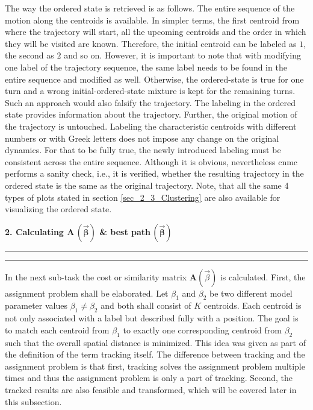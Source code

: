  The way the ordered state is retrieved is as follows. The entire sequence of the motion along the centroids is available. In simpler terms, the first centroid from where the trajectory will start, all the upcoming centroids and the order in which they will be visited are known. 
 Therefore, the initial centroid can be labeled as $1$, the second as $2$ and so on. 
 However, it is important to note that with modifying one label of the trajectory sequence, the same label needs to be found in the entire sequence and modified as well. 
 Otherwise, the ordered-state is true for one turn and a wrong initial-ordered-state mixture is kept for the remaining turns. 
 Such an approach would also falsify the trajectory.
 The labeling in the ordered state provides information about the trajectory. 
Further, the original motion of the trajectory is untouched. Labeling the characteristic centroids with different numbers or with Greek letters does not impose any change on the original dynamics. For that to be fully true, the newly introduced labeling must be consistent across the entire sequence. 
Although it is obvious, nevertheless \gls{cnmc} performs a sanity check, i.e., it is verified, whether the resulting trajectory in the ordered state is the same as the original trajectory. 
Note, that all the same 4 types of plots stated in section \ref{sec_2_3_Clustering} are also available for visualizing the ordered state.
\newline

\textbf{2. Calculating $\bm A \, (\vec{\boldsymbol\beta})$ \& best path$\,(\vec{\boldsymbol\beta})$  }
\hrule
\vspace{0.05cm}
\hrule
\vspace{0.25cm}
In the next sub-task the cost or similarity matrix $\bm A(\vec{\beta})$ is calculated. 
First, the assignment problem shall be elaborated.
Let $\beta_1$ and $\beta_2$ be two different model parameter values $\beta_1 \neq \beta_2$ and both shall consist of $K$ centroids. Each centroid is not only associated with a label but described fully with a position. 
The goal is to match each centroid from $\beta_1$ to exactly one corresponding centroid from $\beta_2$ such that the overall spatial distance is minimized. 
This idea was given as part of the definition of the term tracking itself. 
The difference between tracking and the assignment problem is that first, tracking solves the assignment problem multiple times and thus the assignment problem is only a part of tracking.
Second, the tracked results are also feasible and transformed, which will be covered later in this subsection.\newline


